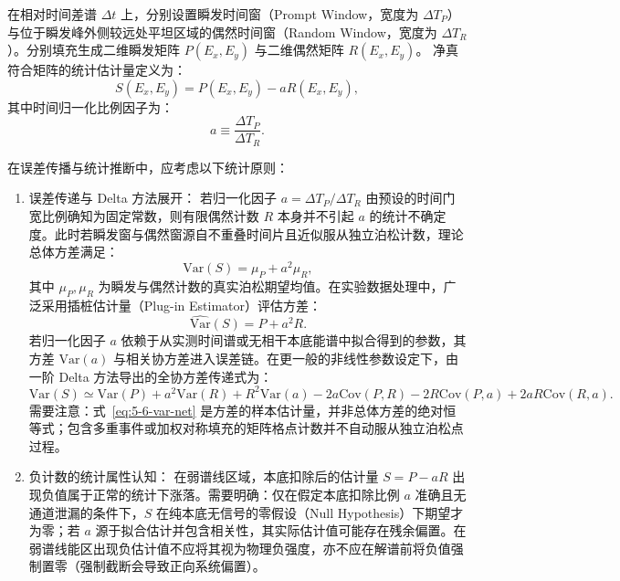 在相对时间差谱 $\Delta t$ 上，分别设置瞬发时间窗（Prompt Window，宽度为 $\Delta T_P$）与位于瞬发峰外侧较远处平坦区域的偶然时间窗（Random Window，宽度为 $\Delta T_R$）。分别填充生成二维瞬发矩阵 $P(E_x, E_y)$ 与二维偶然矩阵 $R(E_x, E_y)$。
净真符合矩阵的统计估计量定义为：
\begin{equation}\label{eq:5-6-prompt-random}
S(E_x, E_y) = P(E_x, E_y) - a R(E_x, E_y),
\end{equation}
其中时间归一化比例因子为：
\begin{equation}\label{eq:5-6-norm-factor}
a \equiv \frac{\Delta T_P}{\Delta T_R}.
\end{equation}

在误差传播与统计推断中，应考虑以下统计原则：
\begin{enumerate}
\item 误差传递与 Delta 方法展开：
若归一化因子 $a = \Delta T_P / \Delta T_R$ 由预设的时间门宽比例确知为固定常数，则有限偶然计数 $R$ 本身并不引起 $a$ 的统计不确定度。此时若瞬发窗与偶然窗源自不重叠时间片且近似服从独立泊松计数，理论总体方差满足：
\begin{equation}\label{eq:5-6-var-population}
\mathrm{Var}(S) = \mu_P + a^2 \mu_R,
\end{equation}
其中 $\mu_P, \mu_R$ 为瞬发与偶然计数的真实泊松期望均值。在实验数据处理中，广泛采用插桩估计量（Plug-in Estimator）评估方差：
\begin{equation}\label{eq:5-6-var-net}
\widehat{\mathrm{Var}}(S) = P + a^2 R.
\end{equation}
若归一化因子 $a$ 依赖于从实测时间谱或无相干本底能谱中拟合得到的参数，其方差 $\mathrm{Var}(a)$ 与相关协方差进入误差链。在更一般的非线性参数设定下，由一阶 Delta 方法导出的全协方差传递式为：
\begin{equation}\label{eq:5-6-var-cov-expanded}
\mathrm{Var}(S) \simeq \mathrm{Var}(P) + a^2 \mathrm{Var}(R) + R^2 \mathrm{Var}(a) - 2a \mathrm{Cov}(P, R) - 2R \mathrm{Cov}(P, a) + 2a R \mathrm{Cov}(R, a).
\end{equation}
需要注意：式~\eqref{eq:5-6-var-net} 是方差的样本估计量，并非总体方差的绝对恒等式；包含多重事件或加权对称填充的矩阵格点计数并不自动服从独立泊松点过程。
\item 负计数的统计属性认知：
在弱谱线区域，本底扣除后的估计量 $S = P - aR$ 出现负值属于正常的统计下涨落。需要明确：仅在假定本底扣除比例 $a$ 准确且无通道泄漏的条件下，$S$ 在纯本底无信号的零假设（Null Hypothesis）下期望才为零；若 $a$ 源于拟合估计并包含相关性，其实际估计值可能存在残余偏置。在弱谱线能区出现负估计值不应将其视为物理负强度，亦不应在解谱前将负值强制置零（强制截断会导致正向系统偏置）。
\end{enumerate}

